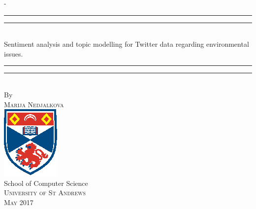 \begin{titlingpage}
\begin{SingleSpace}
\calccentering{\unitlength} 
\begin{adjustwidth*}{\unitlength}{-\unitlength}
\vspace*{13mm}
\begin{center}
\rule[0.5ex]{\linewidth}{2pt}\vspace*{-\baselineskip}\vspace*{3.2pt}
\rule[0.5ex]{\linewidth}{1pt}\\[\baselineskip]
{\HUGE Sentiment analysis and topic modelling for Twitter data regarding environmental issues. }\\[4mm]
\rule[0.5ex]{\linewidth}{1pt}\vspace*{-\baselineskip}\vspace{3.2pt}
\rule[0.5ex]{\linewidth}{2pt}\\
\vspace{6.5mm}
{\large By}\\
\vspace{6.5mm}
{\large\textsc{Marija Nedjalkova}}\\
\vspace{11mm}
\includegraphics[scale=2.5]{logos/StAndrewsNoText}\\
\vspace{6mm}
{\large School of Computer Science\\
\textsc{University of St Andrews}}\\
\vspace{11mm}
\vspace{9mm}
{\large\textsc{May 2017}}
\vspace{12mm}
\end{center}
\end{adjustwidth*}
\end{SingleSpace}
\end{titlingpage}